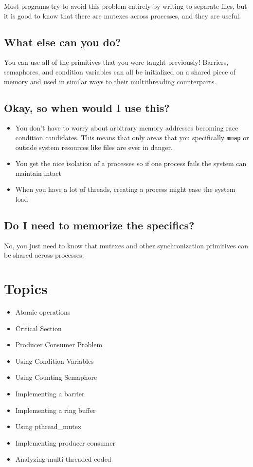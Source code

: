 Most programs try to avoid this problem entirely by writing to separate
files, but it is good to know that there are mutexes across processes,
and they are useful.

\subsection{What else can you do?}\label{what-else-can-you-do}

You can use all of the primitives that you were taught previously!
Barriers, semaphores, and condition variables can all be initialized on
a shared piece of memory and used in similar ways to their
multithreading counterparts.

\subsection{Okay, so when would I use
this?}\label{okay-so-when-would-i-use-this}

\begin{itemize}
\tightlist
\item
  You don't have to worry about arbitrary memory addresses becoming race
  condition candidates. This means that only areas that you specifically
  \texttt{mmap} or outside system resources like files are ever in
  danger.
\item
  You get the nice isolation of a processes so if one process fails the
  system can maintain intact
\item
  When you have a lot of threads, creating a process might ease the
  system load
\end{itemize}

\subsection{Do I need to memorize the
specifics?}\label{do-i-need-to-memorize-the-specifics}

No, you just need to know that mutexes and other synchronization
primitives can be shared across processes.

\section{Topics}\label{topics}

\begin{itemize}
\tightlist
\item
  Atomic operations
\item
  Critical Section
\item
  Producer Consumer Problem
\item
  Using Condition Variables
\item
  Using Counting Semaphore
\item
  Implementing a barrier
\item
  Implementing a ring buffer
\item
  Using pthread\_mutex
\item
  Implementing producer consumer
\item
  Analyzing multi-threaded coded
\end{itemize}

